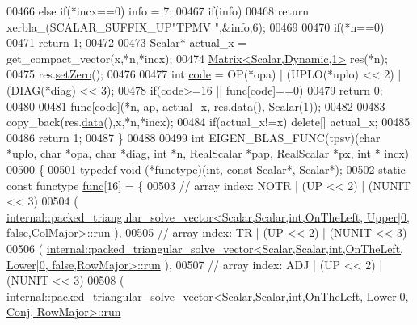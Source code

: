 \begin{DoxyCode}
00466   \textcolor{keywordflow}{else} \textcolor{keywordflow}{if}(*incx==0)                                                   info = 7;
00467   \textcolor{keywordflow}{if}(info)
00468     \textcolor{keywordflow}{return} xerbla\_(SCALAR\_SUFFIX\_UP\textcolor{stringliteral}{"TPMV "},&info,6);
00469 
00470   \textcolor{keywordflow}{if}(*n==0)
00471     \textcolor{keywordflow}{return} 1;
00472 
00473   Scalar* actual\_x = get\_compact\_vector(x,*n,*incx);
00474   \hyperlink{group___core___module}{Matrix<Scalar,Dynamic,1>} res(*n);
00475   res.\hyperlink{class_eigen_1_1_plain_object_base_ac21ad5f989f320e46958b75ac8d9a1da}{setZero}();
00476 
00477   \textcolor{keywordtype}{int} \hyperlink{structcode}{code} = OP(*opa) | (UPLO(*uplo) << 2) | (DIAG(*diag) << 3);
00478   \textcolor{keywordflow}{if}(code>=16 || func[code]==0)
00479     \textcolor{keywordflow}{return} 0;
00480 
00481   func[code](*n, ap, actual\_x, res.\hyperlink{class_eigen_1_1_plain_object_base_ac25699535374b1854cf8494e44ad31b2}{data}(), Scalar(1));
00482 
00483   copy\_back(res.\hyperlink{class_eigen_1_1_plain_object_base_ac25699535374b1854cf8494e44ad31b2}{data}(),x,*n,*incx);
00484   \textcolor{keywordflow}{if}(actual\_x!=x) \textcolor{keyword}{delete}[] actual\_x;
00485 
00486   \textcolor{keywordflow}{return} 1;
00487 \}
00488 
00499 \textcolor{keywordtype}{int} EIGEN\_BLAS\_FUNC(tpsv)(\textcolor{keywordtype}{char} *uplo, \textcolor{keywordtype}{char} *opa, \textcolor{keywordtype}{char} *diag, \textcolor{keywordtype}{int} *n, RealScalar *pap, RealScalar *px, \textcolor{keywordtype}{int} *
      incx)
00500 \{
00501   \textcolor{keyword}{typedef} void (*functype)(int, \textcolor{keyword}{const} Scalar*, Scalar*);
00502   \textcolor{keyword}{static} \textcolor{keyword}{const} functype \hyperlink{structfunc}{func}[16] = \{
00503     \textcolor{comment}{// array index: NOTR  | (UP << 2) | (NUNIT << 3)}
00504     (
      \hyperlink{structinternal_1_1packed__triangular__solve__vector}{internal::packed\_triangular\_solve\_vector<Scalar,Scalar,int,OnTheLeft, Upper|0,       false,ColMajor>::run}
      ),
00505     \textcolor{comment}{// array index: TR    | (UP << 2) | (NUNIT << 3)}
00506     (
      \hyperlink{structinternal_1_1packed__triangular__solve__vector}{internal::packed\_triangular\_solve\_vector<Scalar,Scalar,int,OnTheLeft, Lower|0,       false,RowMajor>::run}
      ),
00507     \textcolor{comment}{// array index: ADJ   | (UP << 2) | (NUNIT << 3)}
00508     (
      \hyperlink{structinternal_1_1packed__triangular__solve__vector}{internal::packed\_triangular\_solve\_vector<Scalar,Scalar,int,OnTheLeft, Lower|0,       Conj, RowMajor>::run}

\end{DoxyCode}
